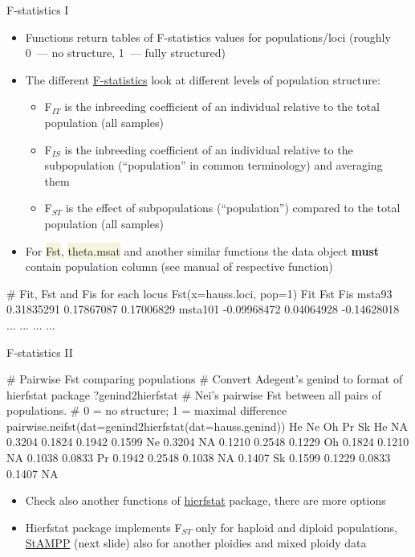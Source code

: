 \documentclass[compress, ucs, xelatex, 11pt, xcolor=svgnames, aspectratio=169,
	hyperref={
		bookmarks=true,
		unicode=true,
		colorlinks=true,
		pdftitle={Molecular data in R},
		plainpages=false,
		pdfauthor={Vojtech Zeisek},
		pdfsubject={Course about phylogeny and evolution in R},
		pdfcreator={XeLaTeX},
		pdfkeywords={R, evolution, phylogeny, molecular data},
		linkcolor=Crimson, %
		anchorcolor=Magenta, %
		citecolor=Magenta, %
		filecolor=Magenta, %
		menucolor=Magenta, %
		urlcolor=DodgerBlue, %
		pdftex},
	url={hyphens, lowtilde} %
	]{beamer}
\renewcommand{\texttt}[1]{\colorbox{Beige}{{\ttfamily #1}}}
\begin{document}
\begin{frame}[fragile]{F-statistics I}
	\begin{itemize}
		\item Functions return tables of F-statistics values for populations/loci (roughly 0~--- no structure, 1~--- fully structured)
		\item The different \href{https://en.wikipedia.org/wiki/F-statistics}{F-statistics} look at different levels of population structure:
		\begin{itemize}
			\item F$_{IT}$ is the inbreeding coefficient of an individual relative to the total population (all samples)
			\item F$_{IS}$ is the inbreeding coefficient of an individual relative to the subpopulation (\enquote{population} in common terminology) and averaging them
			\item F$_{ST}$ is the effect of subpopulations (\enquote{population}) compared to the total population (all samples)
		\end{itemize}
		\item For \texttt{Fst}, \texttt{theta.msat} and another similar functions the data object \textbf{must} contain population column (see manual of respective function)
	\end{itemize}
	\begin{spluscode}
    # Fit, Fst and Fis for each locus
    Fst(x=hauss.loci, pop=1)
                    Fit        Fst         Fis
    msta93   0.31835291 0.17867087  0.17006829
    msta101 -0.09968472 0.04064928 -0.14628018
        ...         ...        ...         ...
	\end{spluscode}
\end{frame}

\begin{frame}[fragile]{F-statistics II}
	\begin{spluscode}
    # Pairwise Fst comparing populations
    # Convert Adegent's genind to format of hierfstat package
    ?genind2hierfstat
    # Nei's pairwise Fst between all pairs of populations.
    # 0 = no structure; 1 = maximal difference
    pairwise.neifst(dat=genind2hierfstat(dat=hauss.genind))
           He     Ne     Oh     Pr     Sk
    He     NA 0.3204 0.1824 0.1942 0.1599
    Ne 0.3204     NA 0.1210 0.2548 0.1229
    Oh 0.1824 0.1210     NA 0.1038 0.0833
    Pr 0.1942 0.2548 0.1038     NA 0.1407
    Sk 0.1599 0.1229 0.0833 0.1407     NA
	\end{spluscode}
	\begin{itemize}
		\item Check also another functions of \href{https://CRAN.R-project.org/package=hierfstat}{hierfstat} package, there are more options
		\item Hierfstat package implements F$_{ST}$ only for haploid and diploid populations, \href{https://CRAN.R-project.org/package=StAMPP}{StAMPP} (next slide) also for another ploidies and mixed ploidy data
	\end{itemize}
\end{frame}
\end{document}
